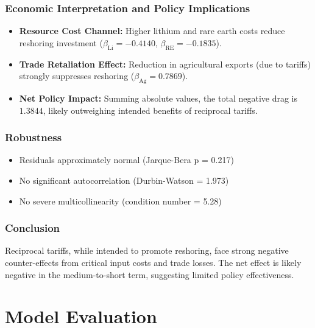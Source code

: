 \documentclass{apmcmthesis}
\begin{document}
\subsubsection{Economic Interpretation and Policy Implications}
\begin{itemize}
    \item \textbf{Resource Cost Channel:} Higher lithium and rare earth costs reduce reshoring investment ($\beta_{\mathrm{Li}}=-0.4140$, $\beta_{\mathrm{RE}}=-0.1835$).
    \item \textbf{Trade Retaliation Effect:} Reduction in agricultural exports (due to tariffs) strongly suppresses reshoring ($\beta_{\mathrm{Ag}}=0.7869$).
    \item \textbf{Net Policy Impact:} Summing absolute values, the total negative drag is $1.3844$, likely outweighing intended benefits of reciprocal tariffs.
\end{itemize}

\subsubsection{Robustness}
\begin{itemize}
    \item Residuals approximately normal (Jarque-Bera p = 0.217)
    \item No significant autocorrelation (Durbin-Watson = 1.973)
    \item No severe multicollinearity (condition number = 5.28)
\end{itemize}

\subsubsection{Conclusion}
Reciprocal tariffs, while intended to promote reshoring, face strong negative counter-effects from critical input costs and trade losses. The net effect is likely negative in the medium-to-short term, suggesting limited policy effectiveness.


\section{Model Evaluation}
\end{document}
